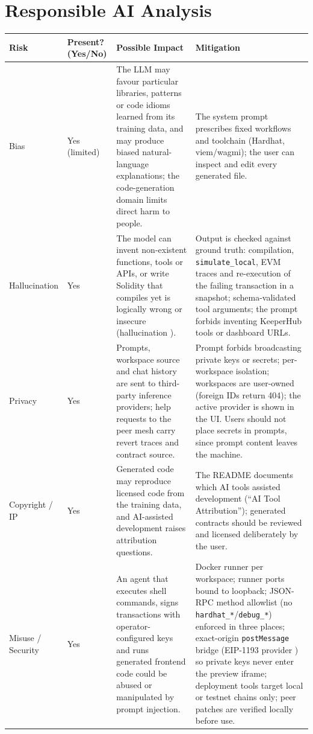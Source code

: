 \documentclass[11pt,letterpaper]{article}
\begin{document}
\section{Responsible AI Analysis}
{\small
\begin{longtable}{|L{0.8in}|L{0.65in}|L{2.1in}|L{2.1in}|}
\hline
\textbf{Risk} & \textbf{Present? (Yes/No)} & \textbf{Possible Impact} & \textbf{Mitigation}\\\hline
Bias & Yes (limited) & The LLM may favour particular libraries, patterns or code idioms learned from its training data, and may produce biased natural-language explanations; the code-generation domain limits direct harm to people. & The system prompt prescribes fixed workflows and toolchain (Hardhat, viem/wagmi); the user can inspect and edit every generated file.\\\hline
Hallucination & Yes & The model can invent non-existent functions, tools or APIs, or write Solidity that compiles yet is logically wrong or insecure (hallucination \cite{ji2023hallucination}). & Output is checked against ground truth: compilation, \texttt{simulate\_local}, EVM traces and re-execution of the failing transaction in a snapshot; schema-validated tool arguments; the prompt forbids inventing KeeperHub tools or dashboard URLs.\\\hline
Privacy & Yes & Prompts, workspace source and chat history are sent to third-party inference providers; help requests to the peer mesh carry revert traces and contract source. & Prompt forbids broadcasting private keys or secrets; per-workspace isolation; workspaces are user-owned (foreign IDs return 404); the active provider is shown in the UI. Users should not place secrets in prompts, since prompt content leaves the machine.\\\hline
Copyright / IP & Yes & Generated code may reproduce licensed code from the training data, and AI-assisted development raises attribution questions. & The README documents which AI tools assisted development (``AI Tool Attribution''); generated contracts should be reviewed and licensed deliberately by the user.\\\hline
Misuse / Security & Yes & An agent that executes shell commands, signs transactions with operator-configured keys and runs generated frontend code could be abused or manipulated by prompt injection. & Docker runner per workspace; runner ports bound to loopback; JSON-RPC method allowlist (no \texttt{hardhat\_*}/\texttt{debug\_*}) enforced in three places; exact-origin \texttt{postMessage} bridge (EIP-1193 provider \cite{eip1193}) so private keys never enter the preview iframe; deployment tools target local or testnet chains only; peer patches are verified locally before use.\\\hline
\end{longtable}}
\end{document}
